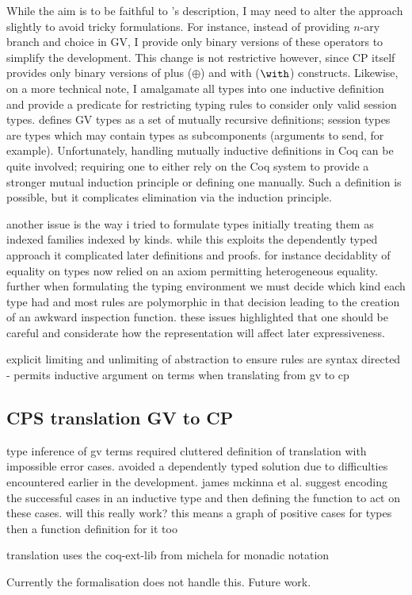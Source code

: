 \begin{comment}
FIGURES

types

terms

typing judgements
\end{comment}



While the aim is to be faithful to \citeauthor{Wadler:2014}'s description, I
may need to alter the approach slightly to avoid tricky formulations. For
instance, instead of providing $n$-ary branch and choice in GV, I provide
only binary versions of these operators to simplify the development. This
change is not restrictive however, since CP itself provides only binary
versions of plus ($\oplus$) and with ($\with$) constructs. Likewise, on a more
technical note, I amalgamate all types into one inductive definition and
provide a predicate for restricting typing rules to consider only valid
session types. \citeauthor{Wadler:2014} defines GV types as a set of mutually
recursive definitions; session types are types which may contain types as
subcomponents (arguments to send, for example). Unfortunately, handling
mutually inductive definitions in Coq can be quite involved; requiring one to
either rely on the Coq system to provide a stronger mutual induction principle
or defining one manually. Such a definition is possible, but it complicates
elimination via the induction principle.

another issue is the way i tried to formulate types initially treating them as
indexed families indexed by kinds. while this exploits the dependently typed
approach it complicated later definitions and proofs. for instance decidablity
of equality on types now relied on an axiom permitting heterogeneous
equality. further when formulating the typing environment we must decide which
kind each type had and most rules are polymorphic in that decision leading to
the creation of an awkward inspection function. these issues highlighted that
one should be careful and considerate how the representation will affect later
expressiveness.

explicit limiting and unlimiting of abstraction to ensure rules are syntax
directed - permits inductive argument on terms when translating from gv to cp

\subsection{CPS translation GV to CP}

type inference of gv terms required cluttered definition of translation with
impossible error cases. avoided a dependently typed solution due to
difficulties encountered earlier in the development. james mckinna et
al. suggest encoding the successful cases in an inductive type and then
defining the function to act on these cases. will this really work? this means
a graph of positive cases for types then a function definition for it too

translation uses the coq-ext-lib from michela for monadic notation

Currently the formalisation does not handle this. Future work.
